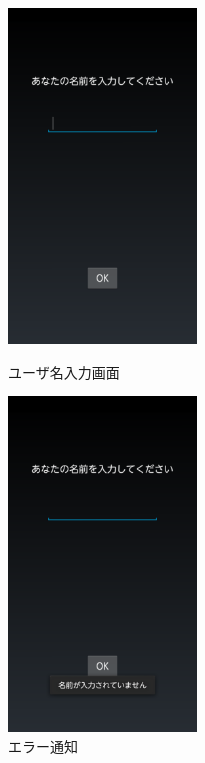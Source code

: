 \documentclass[11pt]{jreport}
\begin{document}
        \begin{figure}[tbhp]
            \begin{minipage}{0.33\hsize}
                \begin{center}
                    \includegraphics[width=5cm, bb=0 0 540 960]{NameInput.pdf}
                \end{center}
                \caption{ユーザ名入力画面}
                \label{nameInput}
            \end{minipage}
            \begin{minipage}{0.33\hsize}
                \begin{center}
                    \includegraphics[width=5cm, bb=0 0 540 960]{NameInputError.pdf}
                \end{center}
                \caption{エラー通知}
                \label{nameInputError}
            \end{minipage}

\end{figure}
\end{document}
